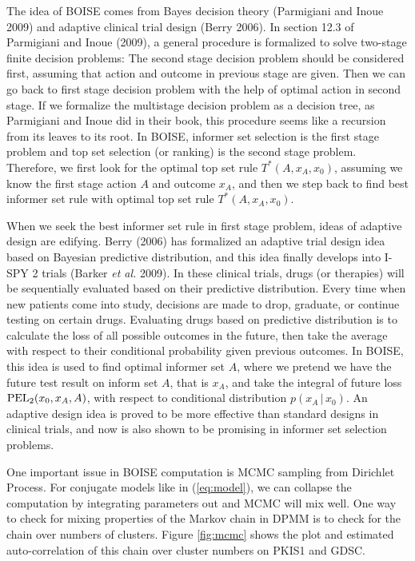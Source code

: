 \documentclass[12pt]{article}
\begin{document}
The idea of BOISE comes from Bayes decision theory (Parmigiani and Inoue 2009) and adaptive clinical trial design (Berry 2006). In section 12.3 of Parmigiani and Inoue (2009), a general procedure is formalized to solve two-stage finite decision problems: The second stage decision problem should be considered first, assuming that action and outcome in previous stage are given. Then we can go back to first stage decision problem with the help of optimal action in second stage. If we formalize the multistage decision problem as a decision tree, as Parmigiani and Inoue did in their book, this procedure seems like a recursion from its leaves to its root. In BOISE, informer set selection is the first stage problem and top set selection (or ranking) is the second stage problem. Therefore, we first look for the optimal top set rule $T^*(A,x_A,x_0)$, assuming we know the first stage action $A$ and outcome $x_A$, and then we step back to find best informer set rule with optimal top set rule $T^*(A,x_A,x_0)$. 

When we seek the best informer set rule in first stage problem, ideas of adaptive design are edifying. Berry (2006) has formalized an adaptive trial design idea based on Bayesian predictive distribution, and this idea finally develops into I-SPY 2 trials (Barker {\em et al.} 2009). In these clinical trials, drugs (or therapies) will be sequentially evaluated based on their predictive distribution. Every time when new patients come into study, decisions are made to drop, graduate, or continue testing on certain drugs. Evaluating drugs based on predictive distribution is to calculate the loss of all possible outcomes in the future, then take the average with respect to their conditional probability given previous outcomes. In BOISE, this idea is used to find optimal informer set $A$, where we pretend we have the future test result on inform set $A$, that is $x_A$, and take the integral of future loss ${\rm PEL}_2(x_0,x_A,A)$, with respect to conditional distribution $p(x_A\,|\,x_0)$. An adaptive design idea is proved to be more effective than standard designs in clinical trials, and now is also shown to be promising in informer set selection problems. 

One important issue in BOISE computation is MCMC sampling from Dirichlet Process. For conjugate models like in (\ref{eq:model}), we can collapse the computation by integrating parameters out and MCMC will mix well. One way to check for mixing properties of the Markov chain in DPMM is to check for the chain over numbers of clusters. Figure \ref{fig:mcmc} shows the plot and estimated auto-correlation of this chain over cluster numbers on PKIS1 and GDSC. 
\end{document}
